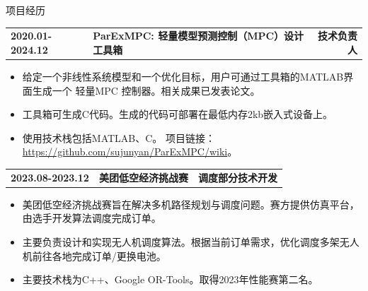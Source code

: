 \documentclass{resume} %
\makeatletter
\newcommand{\projectheader}[3]{%
  \begin{tabular*}{\linewidth}{@{}l@{\extracolsep{\fill}}l@{\extracolsep{\fill}}r@{}}
    \textbf{#1} & \textbf{#2} & \textbf{#3} \\
  \end{tabular*}%
  \vspace{-0.5em} %
}
\makeatother
\begin{document}
\begin{rSection}{项目经历}
    \vspace{3mm}
    \projectheader{2020.01-2024.12}{ParExMPC: 轻量模型预测控制（MPC）设计工具箱}{技术负责人}
    \begin{itemize}
        \item 给定一个非线性系统模型和一个优化目标，用户可通过工具箱的MATLAB界面生成一个 轻量MPC 控制器。相关成果已发表论文。
        \item 工具箱可生成C代码。生成的代码可部署在最低内存2kb嵌入式设备上。
        \item 使用技术栈包括MATLAB、C。 项目链接：\href{https://github.com/sujunyan/ParExMPC/wiki}{https://github.com/sujunyan/ParExMPC/wiki}。
    \end{itemize}

    \vspace{3mm}
    \projectheader{2023.08-2023.12}{美团低空经济挑战赛}{调度部分技术开发}
    \begin{itemize}
        \item 美团低空经济挑战赛旨在解决多机路径规划与调度问题。赛方提供仿真平台，由选手开发算法调度完成订单。
        \item 主要负责设计和实现无人机调度算法。根据当前订单需求，优化调度多架无人机前往各地完成订单/更换电池。
        \item 主要技术栈为C++、Google OR-Tools。取得2023年性能赛第二名。
    \end{itemize}




\end{rSection}
\end{document}
